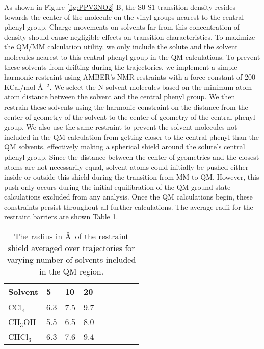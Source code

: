As shown in Figure \ref{fig:PPV3NO2} B, the S0-S1 transition density resides towards the center of the molecule on the vinyl groups nearest to the central phenyl group.
Charge movements on solvents far from this concentration of density should cause negligible effects on transition characteristics.
To maximize the QM/MM calculation utility, we only include the solute and the solvent molecules nearest to this central phenyl group in the QM calculations.
To prevent these solvents from drifting during the trajectories, we implement a simple harmonic restraint using AMBER's NMR restraints with a force constant of 200 KCal/mol \AA\(^{-2}\).
We select the N solvent molecules based on the minimum atom-atom distance between the solvent and the central phenyl group.
We then restrain these solvents using the harmonic constraint on the distance from the center of geometry of the solvent to the center of geometry of the central phenyl group.
We also use the same restraint to prevent the solvent molecules not included in the QM calculation from getting closer to the central phenyl than the QM solvents, effectively making a spherical shield around the solute's central phenyl group.
Since the distance between the center of geometries and the closest atoms are not necessarily equal, solvent atoms could initially be pushed either inside or outside this shield during the transition from MM to QM.
However, this push only occurs during the initial equilibration of the QM ground-state calculations excluded from any analysis.
Once the QM calculations begin, these constraints persist throughout all further calculations.
The average radii for the restraint barriers are shown Table \ref{tab:restraints}.

\begin{table}[H]
  \caption[Restraint radii]{The radius in \AA\ of the restraint shield averaged over trajectories for varying number of solvents included in the QM region.} \label{tab:restraints}
  \begin{tabularx}{\textwidth}{XXXXXXXXX}\hline
    Solvent   & 5  & 10 & 20 \\\hline
    CCl\(_4\)  & 6.3  & 7.5    & 9.7 \\
    CH\(_3\)OH & 5.5 &  6.5   & 8.0 \\
    CHCl\(_3\) & 6.3 &  7.6   & 9.4 \\\hline
  \end{tabularx}
\end{table}

